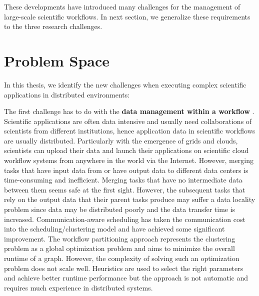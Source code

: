 These developments have introduced many challenges for the management of large-scale scientific workflows. In next section, we generalize these requirements to the three research challenges. 

\section{Problem Space}

In this thesis, we identify the new challenges when executing complex scientific applications in distributed environments:

The first challenge has to do with the \textbf{data management within a workflow}  \cite{wang2013supporting, wang2012scimate, wang2014removing}. Scientific applications are often data intensive and usually need collaborations of scientists from different institutions, hence application data in scientific workflows are usually distributed. Particularly with the emergence of grids and clouds, scientists can upload their data and launch their applications on scientific cloud workflow systems from anywhere in the world via the Internet. However, merging tasks that have input data from or have output data to different data centers is time-consuming and inefficient. Merging tasks that have no intermediate data between them seems safe at the first sight. However, the subsequent tasks that rely on the output data that their parent tasks produce may suffer a data locality problem since data may be distributed poorly and the data transfer time is increased. Communication-aware scheduling \cite{Sonmez2006, Jones2004} has taken the communication cost into the scheduling/clustering model and have achieved some significant improvement. The workflow partitioning approach \cite{Hedayat2009, Yuan2010, Wieczorek2005,Rubing2005} represents the clustering problem as a global optimization problem and aims to minimize the overall runtime of a graph. However, the complexity of solving such an optimization problem does not scale well. Heuristics \cite{Maheshwari2012, Callaghan2010} are used to select the right parameters and achieve better runtime performance but the approach is not automatic and requires much experience in distributed systems. 


